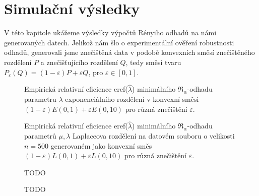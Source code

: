 \chapter{Simulační výsledky}

\noindent V této kapitole ukážeme výsledky výpočtů Rényiho odhadů na námi generovaných datech. Jelikož nám šlo o experimentální ověření robustnosti odhadů, generovali jsme znečištěná data v podobě konvexních směsí znečištěného rozdělení $P$ a znečišťujícího rozdělení $Q$, tedy směsi tvaru $P_\varepsilon(Q) = (1-\varepsilon)P + \varepsilon Q$, pro $\varepsilon \in [0,1].$



\begin{figure}[htb]
	\begin{center}
		\caption{Empirická relativní eficience eref($\hat{\lambda}$) minimálního $\mathfrak{R}_\alpha$-odhadu parametru $\lambda$ exponenciálního rozdělení v konvexní směsi 
		$(1-\varepsilon)E(0,1) + \varepsilon E(0,10)$ pro různá znečištění $\varepsilon$.}
		\label{fig-eref-Exp-lambda}
	\end{center}
\end{figure}

\begin{figure}[htb]
	\begin{center}
		\caption{Empirická relativní eficience eref($\hat{\lambda}$) minimálního $\mathfrak{R}_\alpha$-odhadu parametrů  $\mu,\lambda$ Laplaceova rozdělení na datovém souboru o velikosti $n = 500$ generovaném	jako konvexní směs	$(1-\varepsilon)L(0,1) + \varepsilon L(0,10)$ pro různá znečištění $\varepsilon$.}
		\label{fig-eref-Laplace-lambda}
	\end{center}
\end{figure}

\begin{figure}[htb]
	\begin{center}
		\caption{ TODO }
		\label{fig-eref-Exp-mu}
	\end{center}
\end{figure}

\begin{figure}[htb]
	\begin{center}
		\caption{ TODO }
		\label{fig-eref-Laplace-mu}
	\end{center}
\end{figure}


